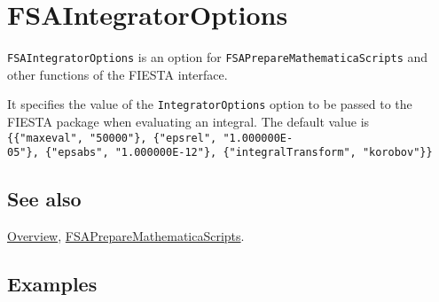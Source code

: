 \documentclass[../FeynHelpersManual.tex]{subfiles}
\begin{document}
\begin{Shaded}
\begin{Highlighting}[]
 
\end{Highlighting}
\end{Shaded}

\hypertarget{fsaintegratoroptions}{
\section{FSAIntegratorOptions}\label{fsaintegratoroptions}}

\texttt{FSAIntegratorOptions} is an option for
\texttt{FSAPrepareMathematicaScripts} and other functions of the FIESTA
interface.

It specifies the value of the \texttt{IntegratorOptions} option to be
passed to the FIESTA package when evaluating an integral. The default
value is
\texttt{\{\allowbreak{}\{\allowbreak{}"maxeval",\ \allowbreak{}"50000"\},\ \allowbreak{}\{\allowbreak{}"epsrel",\ \allowbreak{}"1.000000E-05"\},\ \allowbreak{}\{\allowbreak{}"epsabs",\ \allowbreak{}"1.000000E-12"\},\ \allowbreak{}\{\allowbreak{}"integralTransform",\ \allowbreak{}"korobov"\}\}}

\subsection{See also}

\hyperlink{toc}{Overview},
\hyperlink{fsapreparemathematicascripts}{FSAPrepareMathematicaScripts}.

\subsection{Examples}
\end{document}
